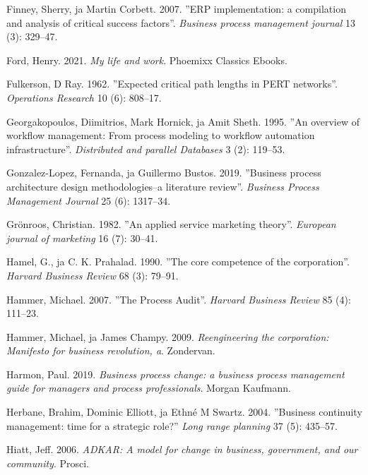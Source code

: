 \documentclass[
  finnish,
  letterpaper,
  DIV=11,
  numbers=noendperiod,
  oneside]{scrreprt}
\newlength{\cslhangindent}
\newenvironment{CSLReferences}[2] %
 {\begin{list}{}{%
  \setlength{\itemindent}{0pt}
  \setlength{\leftmargin}{0pt}
  \setlength{\parsep}{0pt}
  \ifodd #1
   \setlength{\leftmargin}{\cslhangindent}
   \setlength{\itemindent}{-1\cslhangindent}
  \fi
  \setlength{\itemsep}{#2\baselineskip}}}
 {\end{list}}
\begin{document}
\begin{CSLReferences}{1}{1}
Finney, Sherry, ja Martin Corbett. 2007. {''ERP implementation: a
compilation and analysis of critical success factors''}. \emph{Business
process management journal} 13 (3): 329--47.

Ford, Henry. 2021. \emph{My life and work}. Phoemixx Classics Ebooks.

Fulkerson, D Ray. 1962. {''Expected critical path lengths in PERT
networks''}. \emph{Operations Research} 10 (6): 808--17.

Georgakopoulos, Diimitrios, Mark Hornick, ja Amit Sheth. 1995. {''An
overview of workflow management: From process modeling to workflow
automation infrastructure''}. \emph{Distributed and parallel Databases}
3 (2): 119--53.

Gonzalez-Lopez, Fernanda, ja Guillermo Bustos. 2019. {''Business process
architecture design methodologies--a literature review''}.
\emph{Business Process Management Journal} 25 (6): 1317--34.

Grönroos, Christian. 1982. {''An applied service marketing theory''}.
\emph{European journal of marketing} 16 (7): 30--41.

Hamel, G., ja C. K. Prahalad. 1990. {''The core competence of the
corporation''}. \emph{Harvard Business Review} 68 (3): 79--91.

Hammer, Michael. 2007. {''The Process Audit''}. \emph{Harvard Business
Review} 85 (4): 111--23.

Hammer, Michael, ja James Champy. 2009. \emph{Reengineering the
corporation: Manifesto for business revolution, a}. Zondervan.

Harmon, Paul. 2019. \emph{Business process change: a business process
management guide for managers and process professionals}. Morgan
Kaufmann.

Herbane, Brahim, Dominic Elliott, ja Ethné M Swartz. 2004. {''Business
continuity management: time for a strategic role?''} \emph{Long range
planning} 37 (5): 435--57.

Hiatt, Jeff. 2006. \emph{ADKAR: A model for change in business,
government, and our community}. Prosci.


\end{CSLReferences}
\end{document}
